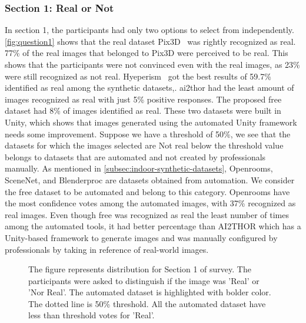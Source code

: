 \subsubsection{Section 1: Real or Not}
In section 1, the participants had only two options to select from independently.
\autoref{fig:question1} shows that the real dataset Pix3D~\cite{pix3d} was rightly recognized as real.
77\% of the real images that belonged to Pix3D were perceived to be real.
This shows that the participants were not convinced even with the real images, as 23\% were still recognized as not real.
Hyeperism~\cite{Roberts2020HypersimAP} got the best results of 59.7\% identified as real among the synthetic datasets,.
\gls{ai2thor} had the least amount of images recognized as real with just 5\% positive responses.
The proposed \gls{free} dataset had 8\% of images identified as real.
These two datasets were built in Unity, which shows that images generated using the automated Unity framework needs some improvement.
Suppose we have a threshold of 50\%, we see that the datasets for which the images selected are Not real below the threshold value belongs to datasets that are automated and not created by professionals manually.
As mentioned in \autoref{subsec:indoor-synthetic-datasets}, Openrooms, SceneNet, and Blenderproc are datasets obtained from automation.
We consider the \gls{free} dataset to be automated and belong to this category.
Openrooms have the most confidence votes among the automated images, with 37\% recognized as real images.
Even though \gls{free} was recognized as real the least number of times among the automated tools, it had better percentage than AI2THOR
which has a Unity-based framework to generate images and was manually configured by professionals by taking in reference of real-world images.

\begin{figure}
    \centering
    \resizebox{\textwidth}{!}{}
    \caption{The figure represents distribution for Section 1 of survey. The participants were asked to distinguish if the image was 'Real' or 'Nor Real'.
    The automated dataset is highlighted with bolder color. The dotted line is 50\% threshold. All the automated dataset have less than threshold votes for 'Real'.}
    \label{fig:question1}
\end{figure}

